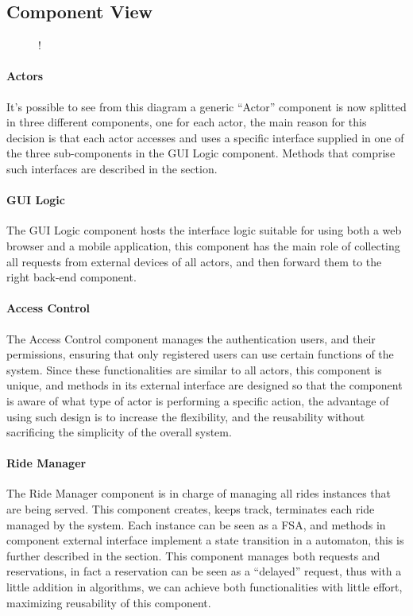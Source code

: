 \subsection{Component View}
\label{sec:component-view}
\begin{figure}[H]
	\centering
	\resizebox{6in}
	{!}{}
\end{figure}
\paragraph{Actors}
It's possible to see from this diagram a generic ``Actor'' component is now splitted in three different components, one for each actor, the main reason for this decision is that each actor accesses and uses a specific interface supplied in one of the three sub-components in the GUI Logic component. Methods that comprise such interfaces are described in the  section.
\paragraph{GUI Logic}
The GUI Logic component hosts the interface logic suitable for using both a web browser and a mobile application, this component has the main role of collecting all requests from external devices of all actors, and then forward them to the right back-end component.
\paragraph{Access Control}
The Access Control component manages the authentication users, and their permissions, ensuring that only registered users can use certain functions of the system. \newline Since these functionalities are similar to all actors, this component is unique, and methods in its external interface are designed so that the component is aware of what type of actor is performing a specific action, the advantage of using such design is to increase the flexibility, and the reusability without sacrificing the simplicity of the overall system.
\paragraph{Ride Manager}
The Ride Manager component is in charge of managing all rides instances that are being served. This component creates, keeps track, terminates each ride managed by the system. Each instance can be seen as a FSA, and methods in component external interface implement a state transition in a automaton, this is further described in the  section. \newline
This component manages both requests and reservations, in fact a reservation can be seen as a ``delayed'' request, thus with a little addition in algorithms, we can achieve both functionalities with little effort, maximizing reusability of this component.
